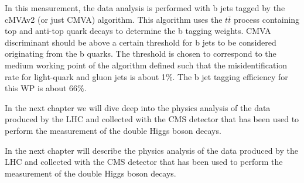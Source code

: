 \begin{small}
In this measurement, the data analysis is performed with b jets tagged by the cMVAv2 (or just CMVA) algorithm. This algorithm uses the $t\bar{t}$ process containing top and anti-top quark decays to determine the b tagging weights. CMVA discriminant should be above a certain threshold for b jets to be considered originating from the b quarks. The threshold is chosen to correspond to the medium working point of the algorithm defined such that the misidentification rate for light-quark and gluon jets is about 1$\%$.  The b jet tagging efficiency for this WP is about 66$\%$.

In the next chapter we will dive deep into the physics analysis of the data produced by the LHC and collected with the CMS detector that has been used to perform the measurement of the double Higgs boson decays.

In the next chapter will describe the physics analysis of the data produced by the LHC and collected with the CMS detector that has been used to perform the measurement of the double Higgs boson decays.


\end{small}             %

\iffalse

